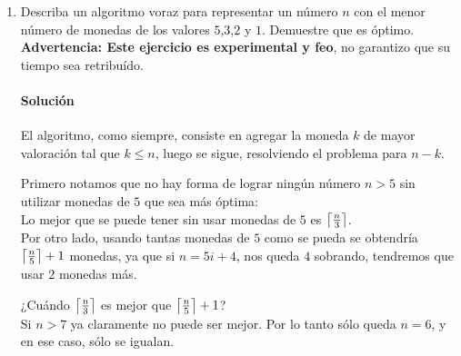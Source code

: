 \documentclass[spanish, fleqn]{article}
\DeclarePairedDelimiter{\ceil}{\lceil}{\rceil}
\begin{document}
\begin{enumerate}
\item Describa un algoritmo voraz para representar un número $n$ con el menor número de monedas de los valores $5$,$3$,$2$ y $1$. Demuestre que es óptimo.
\\\textbf{Advertencia: Este ejercicio es experimental y feo}, no garantizo que su tiempo sea retribuído.
\paragraph{Solución} El algoritmo, como siempre, consiste en agregar la moneda $k$ de mayor valoración tal que $k\leq n$, luego se sigue, resolviendo el problema para $n-k$.




Primero notamos que no hay forma de lograr ningún número $n>5$ sin utilizar monedas de $5$ que sea más óptima:
\\ Lo mejor que se puede tener sin usar monedas de $5$ es $\ceil*{\frac{n}{3}}$.
\\ Por otro lado, usando tantas monedas de $5$ como se pueda se obtendría $\ceil*{\frac{n}{5}}+1$ monedas, ya que si $n= 5i+4$, nos queda $4$ sobrando, tendremos que usar $2$ monedas más.

¿Cuándo $\ceil*{\frac{n}{3}}$ es mejor que $\ceil*{\frac{n}{5}}+1$?
\\ Si $n>7$ ya claramente no puede ser mejor. Por lo tanto sólo queda $n=6$, y en ese caso, sólo se igualan.


\end{enumerate}
\end{document}
